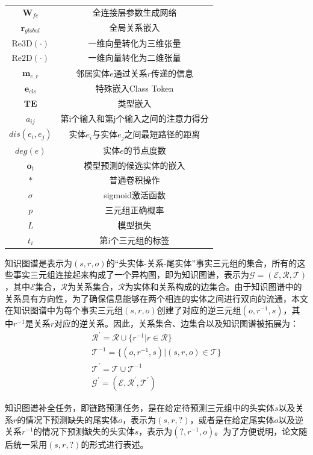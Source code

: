 \begin{longtable}[htbp]{cc}
  $\mathbf{W}_{fc}$ & 全连接层参数生成网络\\
  $\boldsymbol{r}_{global}$ & 全局关系嵌入\\
  $\mbox{Re3D}(\cdot)$ & 一维向量转化为三维张量\\
  $\mbox{Re2D}(\cdot)$ & 一维向量转化为二维张量\\
  $\boldsymbol{m}_{e,r}$ & 邻居实体$e$通过关系$r$传递的信息\\
  $\boldsymbol{e}_{cls}$ & 特殊嵌入Class Token\\
  $\mathbf{TE}$ & 类型嵌入\\
  $a_{ij}$ & 第i个输入和第j个输入之间的注意力得分\\
  $dis(e_i,e_j)$ & 实体$e_i$与实体$e_j$之间最短路径的距离\\
  $deg(e)$ & 实体$e$的节点度数\\
  $\boldsymbol{o}_t$ & 模型预测的候选实体的嵌入\\
  $\ast $ & 普通卷积操作\\
  $\sigma $ & sigmoid激活函数\\
  $p$ & 三元组正确概率\\
  $L$ & 模型损失\\
  $t_i$ & 第i个三元组的标签\\

\end{longtable}

知识图谱是表示为$(s,r,o)$的“头实体-关系-尾实体”事实三元组的集合，所有的这些事实三元组连接起来构成了一个异构图，即为知识图谱，表示为$\mathcal{G} = (\mathcal{E}, \mathcal{R}, \mathcal{T})$，其中$\mathcal{E}$集合，$\mathcal{R}$为关系集合，$\mathcal{R}$为实体和关系构成的边集合。由于知识图谱中的关系具有方向性，为了确保信息能够在两个相连的实体之间进行双向的流通，本文在知识图谱中为每个事实三元组$(s,r,o)$创建了对应的逆三元组$(o,r^{-1},s)$，其中$r^{-1}$是关系$r$对应的逆关系。因此，关系集合、边集合以及知识图谱被拓展为：
\begin{gather}
    \mathcal{R}^{\prime}=\mathcal{R}\cup\{ r^{-1} | r\in \mathcal{R}\}\\
    \mathcal{T}^{-1}= \{ (o,r^{-1},s)| (s,r,o)\in \mathcal{T}\}\\
    \mathcal{T}^{\prime} = \mathcal{T}\cup\mathcal{T}^{-1}\\
    \mathcal{G}^\prime = (\mathcal{E}, \mathcal{R}^\prime, \mathcal{T}^\prime)
\end{gather}

知识图谱补全任务，即链路预测任务，是在给定待预测三元组中的头实体$s$以及关系$r$的情况下预测缺失的尾实体$o$，表示为$(s, r, ?)$，或者是在给定尾实体$o$以及逆关系$r^{-1}$的情况下预测缺失的头实体$s$，表示为$(?, r^{-1} , o) $。为了方便说明，论文随后统一采用$(s, r, ?)$的形式进行表述。


